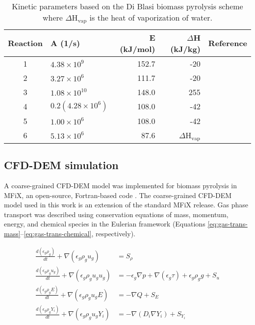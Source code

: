 \begin{table}[H]
    \centering
    \caption{Kinetic parameters based on the Di Blasi biomass pyrolysis scheme where $\Delta$H$_\text{vap}$ is the heat of vaporization of water.}
    \begin{tabular}{clrrr}
        \toprule
        Reaction    & A (1/s)               & E (kJ/mol) & $\Delta$H (kJ/kg) & Reference \\
        \midrule
        1           & $4.38 \times 10^9$                    & 152.7 & -20                       & \cite{Blasi-2001} \\
        2           & $3.27 \times 10^6$                    & 111.7 & -20                       & \cite{Blasi-2001} \\
        3           & $1.08 \times 10^{10}$                 & 148.0 & 255                       & \cite{Blasi-2001} \\
        4           & $0.2\left(4.28 \times 10^6 \right)$   & 108.0 & -42                       & \cite{Blasi-1993,lu2020bridging} \\
        5           & $1.00 \times 10^6$                    & 108.0 & -42                       & \cite{Blasi-1993} \\
        6           & $5.13 \times 10^6$                    & 87.6  & $\Delta$H$_\text{vap}$    & \cite{Chan-1985} \\
        \bottomrule
    \end{tabular}
    \label{tab:kinetic-params}
\end{table}


\subsection{CFD-DEM simulation}

A coarse-grained CFD-DEM model was implemented for biomass pyrolysis in MFiX, an open-source, Fortran-based code \cite{Syamlal-1993}. The coarse-grained CFD-DEM model used in this work is an extension of the standard MFiX release. Gas phase transport was described using conservation equations of mass, momentum, energy, and chemical species in the Eulerian framework (Equations \ref{eq:gas-trans-mass}--\ref{eq:gas-trans-chemical}, respectively).

\begin{align}
    \frac{d(\epsilon_g \rho_g)}{dt} + \nabla (\epsilon_g \rho_g u_g) &= S_\rho \label{eq:gas-trans-mass} \\
    \frac{d(\epsilon_g \rho_g u_g)}{dt} + \nabla (\epsilon_g \rho_g u_g u_g) &= -\epsilon_g \nabla p + \nabla (\epsilon_g \tau) + \epsilon_g \rho_g g + S_u \\
    \frac{d(\epsilon_g \rho_g E)}{dt} + \nabla (\epsilon_g \rho_g u_g E) &= -\nabla Q + S_E \\
    \frac{d(\epsilon_g \rho_g Y_i)}{dt} + \nabla (\epsilon_g \rho_g u_g Y_i) &= -\nabla (D_i \nabla Y_i) + S_{Y_i} \label{eq:gas-trans-chemical}
\end{align}

